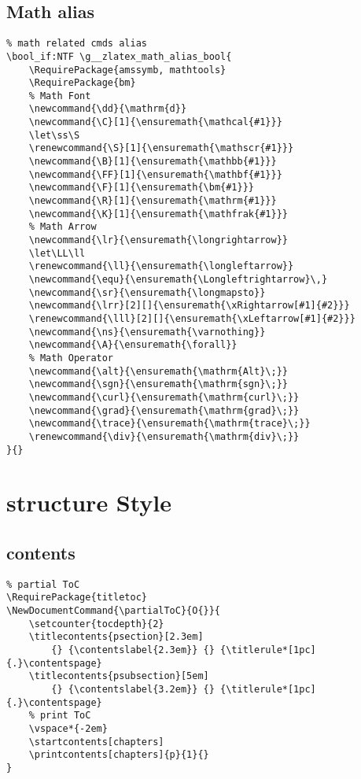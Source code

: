 \subsection{Math alias}
\begin{verbatim}
% math related cmds alias
\bool_if:NTF \g__zlatex_math_alias_bool{
    \RequirePackage{amssymb, mathtools}
    \RequirePackage{bm}          
    % Math Font 
    \newcommand{\dd}{\mathrm{d}}
    \newcommand{\C}[1]{\ensuremath{\mathcal{#1}}}
    \let\ss\S
    \renewcommand{\S}[1]{\ensuremath{\mathscr{#1}}}
    \newcommand{\B}[1]{\ensuremath{\mathbb{#1}}}
    \newcommand{\FF}[1]{\ensuremath{\mathbf{#1}}}
    \newcommand{\F}[1]{\ensuremath{\bm{#1}}}
    \newcommand{\R}[1]{\ensuremath{\mathrm{#1}}}
    \newcommand{\K}[1]{\ensuremath{\mathfrak{#1}}}
    % Math Arrow 
    \newcommand{\lr}{\ensuremath{\longrightarrow}}
    \let\LL\ll
    \renewcommand{\ll}{\ensuremath{\longleftarrow}}
    \newcommand{\equ}{\ensuremath{\Longleftrightarrow}\,}
    \newcommand{\sr}{\ensuremath{\longmapsto}}
    \newcommand{\lrr}[2][]{\ensuremath{\xRightarrow[#1]{#2}}}
    \renewcommand{\lll}[2][]{\ensuremath{\xLeftarrow[#1]{#2}}}
    \newcommand{\ns}{\ensuremath{\varnothing}}
    \newcommand{\A}{\ensuremath{\forall}}
    % Math Operator
    \newcommand{\alt}{\ensuremath{\mathrm{Alt}\;}}
    \newcommand{\sgn}{\ensuremath{\mathrm{sgn}\;}}
    \newcommand{\curl}{\ensuremath{\mathrm{curl}\;}}
    \newcommand{\grad}{\ensuremath{\mathrm{grad}\;}}
    \newcommand{\trace}{\ensuremath{\mathrm{trace}\;}}
    \renewcommand{\div}{\ensuremath{\mathrm{div}\;}}
}{}
\end{verbatim}

\section{structure Style}
\subsection{contents}
\begin{verbatim}
% partial ToC
\RequirePackage{titletoc}
\NewDocumentCommand{\partialToC}{O{}}{
    \setcounter{tocdepth}{2}  
    \titlecontents{psection}[2.3em]
        {} {\contentslabel{2.3em}} {} {\titlerule*[1pc]{.}\contentspage}
    \titlecontents{psubsection}[5em]
        {} {\contentslabel{3.2em}} {} {\titlerule*[1pc]{.}\contentspage}
    % print ToC
    \vspace*{-2em}
    \startcontents[chapters]
    \printcontents[chapters]{p}{1}{}
}
\end{verbatim}

